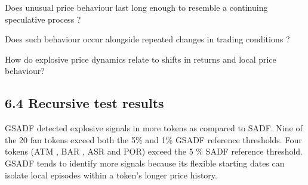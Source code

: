 \documentclass[11pt,a4paper,onecolumn]{article}
\begin{document}
Does unusual price behaviour last long enough to resemble a continuing speculative process ?

Does such behaviour occur alongside repeated changes in trading conditions ?

How do explosive price dynamics relate to shifts in returns and local price behaviour?

\subsection{6.4 Recursive test results}

GSADF detected explosive signals in more tokens as compared to SADF. Nine of the 20 fan tokens exceed both the 5\% and 1\% GSADF reference thresholds. Four tokens (ATM , BAR , ASR and POR) exceed the 5 \% SADF reference threshold. GSADF tends to identify more signals because its flexible starting dates can isolate local episodes within a token's longer price history.
\end{document}

